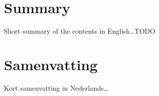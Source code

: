 \cleardoublepage
\begingroup
\let\clearpage\relax
\let\cleardoublepage\relax
\let\cleardoublepage\relax

\chapter*{Summary}
Short summary of the contents in English\dots TODO


\vfill

\chapter*{Samenvatting}
Kort samenvatting in Nederlands\dots


\endgroup			

\vfill